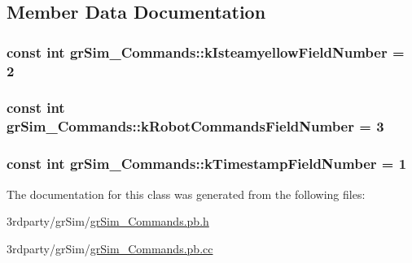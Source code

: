 \subsection{Member Data Documentation}
\hypertarget{classgr_sim___commands_a12c4b2be87fa8002259d6dfb4ba4a3f0}{
\subsubsection[{k\-Isteamyellow\-Field\-Number}]{\setlength{\rightskip}{0pt plus 5cm}const int gr\-Sim\-\_\-\-Commands\-::k\-Isteamyellow\-Field\-Number = 2\hspace{0.3cm}{\ttfamily [static]}}}\label{classgr_sim___commands_a12c4b2be87fa8002259d6dfb4ba4a3f0}
\hypertarget{classgr_sim___commands_a1c3ae12990f5a222520efae4a78b688a}{
\subsubsection[{k\-Robot\-Commands\-Field\-Number}]{\setlength{\rightskip}{0pt plus 5cm}const int gr\-Sim\-\_\-\-Commands\-::k\-Robot\-Commands\-Field\-Number = 3\hspace{0.3cm}{\ttfamily [static]}}}\label{classgr_sim___commands_a1c3ae12990f5a222520efae4a78b688a}
\hypertarget{classgr_sim___commands_a0cea2c202f8b5eee1cf70ee7944b555b}{
\subsubsection[{k\-Timestamp\-Field\-Number}]{\setlength{\rightskip}{0pt plus 5cm}const int gr\-Sim\-\_\-\-Commands\-::k\-Timestamp\-Field\-Number = 1\hspace{0.3cm}{\ttfamily [static]}}}\label{classgr_sim___commands_a0cea2c202f8b5eee1cf70ee7944b555b}


The documentation for this class was generated from the following files\-:\begin{DoxyCompactItemize}
\item 
3rdparty/gr\-Sim/\hyperlink{gr_sim___commands_8pb_8h}{gr\-Sim\-\_\-\-Commands.\-pb.\-h}\item 
3rdparty/gr\-Sim/\hyperlink{gr_sim___commands_8pb_8cc}{gr\-Sim\-\_\-\-Commands.\-pb.\-cc}\end{DoxyCompactItemize}
